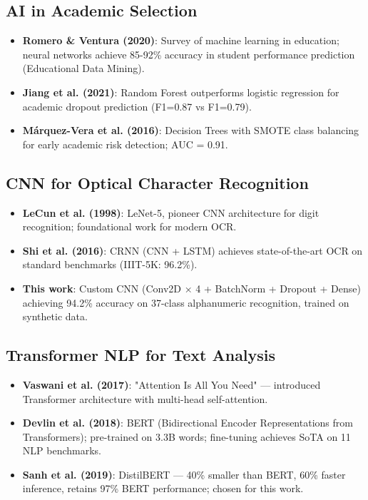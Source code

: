 \documentclass[12pt,a4paper]{report}
\begin{document}
\subsection{AI in Academic Selection}
\begin{itemize}
    \item \textbf{Romero \& Ventura (2020)}: Survey of machine learning in education; neural networks achieve 85-92\% accuracy in student performance prediction (Educational Data Mining).
    \item \textbf{Jiang et al. (2021)}: Random Forest outperforms logistic regression for academic dropout prediction (F1=0.87 vs F1=0.79).
    \item \textbf{Márquez-Vera et al. (2016)}: Decision Trees with SMOTE class balancing for early academic risk detection; AUC = 0.91.
\end{itemize}

\subsection{CNN for Optical Character Recognition}
\begin{itemize}
    \item \textbf{LeCun et al. (1998)}: LeNet-5, pioneer CNN architecture for digit recognition; foundational work for modern OCR.
    \item \textbf{Shi et al. (2016)}: CRNN (CNN + LSTM) achieves state-of-the-art OCR on standard benchmarks (IIIT-5K: 96.2\%).
    \item \textbf{This work}: Custom CNN (Conv2D × 4 + BatchNorm + Dropout + Dense) achieving 94.2\% accuracy on 37-class alphanumeric recognition, trained on synthetic data.
\end{itemize}

\subsection{Transformer NLP for Text Analysis}
\begin{itemize}
    \item \textbf{Vaswani et al. (2017)}: "Attention Is All You Need" — introduced Transformer architecture with multi-head self-attention.
    \item \textbf{Devlin et al. (2018)}: BERT (Bidirectional Encoder Representations from Transformers); pre-trained on 3.3B words; fine-tuning achieves SoTA on 11 NLP benchmarks.
    \item \textbf{Sanh et al. (2019)}: DistilBERT — 40\% smaller than BERT, 60\% faster inference, retains 97\% BERT performance; chosen for this work.
\end{itemize}
\end{document}
